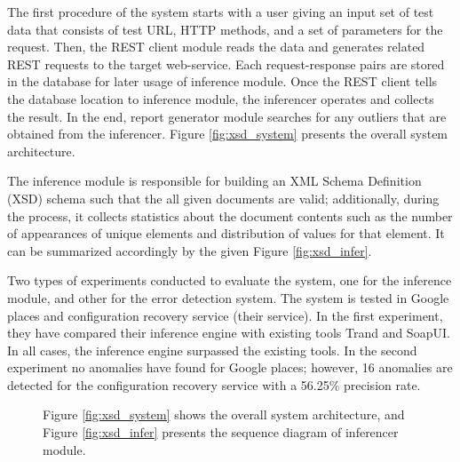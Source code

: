 \documentclass[english]{tktltiki}
\begin{document}
The first procedure of the system starts with a user giving an input set of test data that consists of test URL, HTTP methods, and a set of parameters for the request. Then, the REST client module reads the data and generates related REST requests to the target web-service. Each request-response pairs are stored in the database for later usage of inference module. Once the REST client tells the database location to inference module, the inferencer operates and collects the result. In the end, report generator module searches for any outliers that are obtained from the inferencer. Figure \ref{fig:xsd_system} presents the overall system architecture.

The inference module is responsible for building an XML Schema Definition (XSD) schema such that the all given documents are valid; additionally, during the process, it collects statistics about the document contents such as the number of appearances of unique elements and distribution of values for that element. It can be summarized accordingly by the given Figure \ref{fig:xsd_infer}.

Two types of experiments conducted to evaluate the system, one for the inference module, and other for the error detection system. The system is tested in Google places and configuration recovery service (their service). In the first experiment, they have compared their inference engine with existing tools Trand and SoapUI. In all cases, the inference engine surpassed the existing tools. In the second experiment no anomalies have found for Google places; however, 16 anomalies are detected for the configuration recovery service with a 56.25\% precision rate.
\begin{figure}[h]
	\centering
	\hfill%
	\caption{Figure \ref{fig:xsd_system} shows the overall system architecture, and Figure \ref{fig:xsd_infer} presents the sequence diagram of inferencer module. }
\end{figure}
\end{document}

